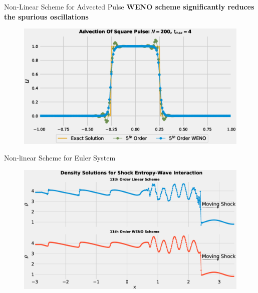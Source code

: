\documentclass[10pt]{beamer}
\begin{document}
\begin{frame}{Non-Linear Scheme for Advected Pulse}
  \centering
  \textbf{WENO scheme significantly reduces the spurious oscillations}
  \begin{figure}[H]
    \centering
    \includegraphics[scale=0.475]{AdvectionHighOrderComparison_pulseWENO.eps}
    \end{figure}
\end{frame}

\begin{frame}{Non-linear Scheme for Euler System}
  \begin{figure}[H]
    \centering
    \includegraphics[scale=0.275]{ShockEntropyComparison.eps}
    \end{figure}
\end{frame}
\end{document}
